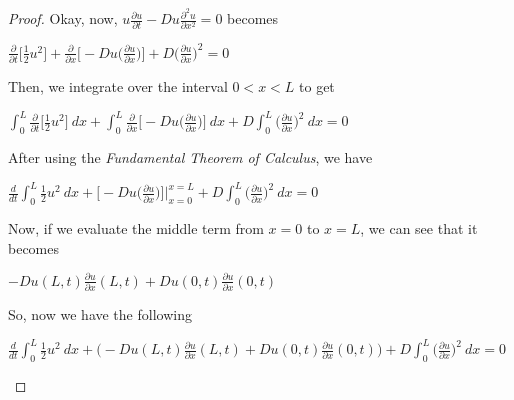 \documentclass[12pt, executivepaper]{article}
\begin{document}
\begin{flushleft}
\begin{proof}
Okay, now, $u \frac{\partial u}{\partial t}-Du \frac{\partial^2 u}{\partial x^2}=0$ becomes

\begin{center}

$\frac{\partial}{\partial t} \bigg[\frac{1}{2} u^2\bigg] + \frac{\partial}{\partial x} \bigg[-Du \bigg(\frac{\partial u}{\partial x}\bigg) \bigg] + D \bigg(\frac{\partial u}{\partial x}\bigg)^2=0$

\end{center}

Then, we integrate over the interval $0 < x < L$ to get

\begin{center}

$\int_{0}^{L} \frac{\partial}{\partial t} \bigg[\frac{1}{2} u^2\bigg] \ dx + \int_{0}^{L} \frac{\partial}{\partial x} \bigg[-Du \bigg(\frac{\partial u}{\partial x}\bigg)\bigg] \ dx + D \int_{0}^{L} \bigg(\frac{\partial u}{\partial x}\bigg)^2 \ dx=0$

\end{center}

After using the \textit{Fundamental Theorem of Calculus}, we have

\begin{center}

$\frac{d}{dt}\int_{0}^{L} \frac{1}{2} u^2 \ dx + \bigg[-Du \bigg(\frac{\partial u}{\partial x}\bigg)\bigg] \Big|_{x=0}^{x=L}+ D \int_{0}^{L} \bigg(\frac{\partial u}{\partial x}\bigg)^2 \ dx=0$

\end{center}

Now, if we evaluate the middle term from $x=0$ to $x=L$, we can see that it becomes

\begin{center}

$-Du(L,t) \frac{\partial u}{\partial x}(L,t) + Du(0,t) \frac{\partial u}{\partial x}(0,t)$

\end{center}

\pagebreak

\vspace*{-40mm}

So, now we have the following

\begin{center}

$\frac{d}{dt}\int_{0}^{L} \frac{1}{2} u^2 \ dx + \bigg(-Du(L,t) \frac{\partial u}{\partial x}(L,t) + Du(0,t) \frac{\partial u}{\partial x}(0,t)\bigg)+ D \int_{0}^{L} \bigg(\frac{\partial u}{\partial x}\bigg)^2 \ dx=0$


\end{center}
\end{proof}
\end{flushleft}
\end{document}
